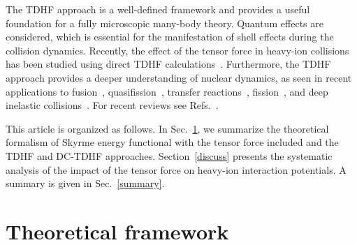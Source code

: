 The TDHF approach is a well-defined framework and provides a useful foundation for a fully microscopic many-body theory.
Quantum effects are considered, which is essential for the manifestation of shell effects during the collision dynamics.
Recently, the effect of the tensor force in heavy-ion collisions has been studied using direct TDHF calculations~\citep{Fracasso2012_PRC86-044303,Dai2014_SciChinaPMA57-1618,Stevenson2016_PRC93-054617,Shi2017_NPR34-41,Guo2018_PLB782-401}.
Furthermore, the TDHF approach provides a deeper understanding of nuclear dynamics, as seen in recent applications to fusion~\citep{Simenel2004_PRL93-102701,Umar2009_PRC80-041601,Oberacker2010_PRC82-034603,Guo2012_EPJWoC38-09003,
	Keser2012_PRC85-044606,Umar2012_PRC85-055801,Simenel2013_PRC88-024617,
	Umar2014_PRC89-034611,Washiyama2015_PRC91-064607,Tohyama2016_PRC93-034607,Godbey2017_PRC95-011601,Simenel2017_PRC95-031601},
quasifission~\citep{Golabek2009_PRL103-042701,Oberacker2014_PRC90-054605,Umar2015_PRC92-024621,Umar2016_PRC94-024605,Yu2017_SciChinaPMA60-092011}, transfer reactions~\citep{Washiyama2009_PRC80-031602,Simenel2010_PRL105-192701,Simenel2011_PRL106-112502,Scamps2013_PRC87-014605,Sekizawa2013_PRC88-014614,
	Wang2016_PLB760-236,Sekizawa2016_PRC93-054616,Sekizawa2017_PRC96-041601},
fission~\citep{Simenel2014_PRC89-031601,Scamps2015_PRC92-011602,Goddard2015_PRC92-054610,Goddard2016_PRC93-014620,Bulgac2016_PRL116-122504,Tanimura2017_PRL118-152501},
and deep inelastic collisions~\citep{Maruhn2006_PRC74-027601,Guo2007_PRC76-014601,Guo2008_PRC77-041301,Iwata2011_PRC84-014616,Dai2014_PRC90-044609,Dai2014_SciChinaPMA57-1618,
	Stevenson2016_PRC93-054617,Guo2017_EPJWoC163-00021,Shi2017_NPR34-41,Umar2017_PRC96-024625}.
For recent reviews see Refs.~\citep{Simenel2012_EPJA48-152,Nakatsukasa2016_RMP88-045004,Simenel2018_PPNP}.

This article is organized as follows. In Sec.~\ref{tenpot:theory}, we summarize the theoretical formalism of Skyrme energy functional with the tensor force included and the TDHF and DC-TDHF approaches.
Section~\ref{discuss} presents the systematic analysis of the impact of the tensor force on heavy-ion interaction potentials.
A summary is given in Sec.~\ref{summary}.

\section{Theoretical framework}
\label{tenpot:theory}

